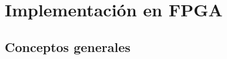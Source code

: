 \chapter{Implementación en FPGA}\label{ch:fpga}

\section{Conceptos generales}\label{subc:fpga_congen}



